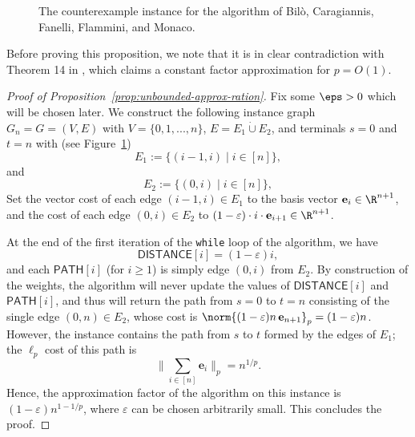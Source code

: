 \documentclass[11pt,a4paper]{article}
\begin{document}
\begin{figure}[H]
    \centering
    
    \caption{The counterexample instance for the algorithm of Bilò, Caragiannis, Fanelli, Flammini, and Monaco.}
    \label{fig:dijkstras-counterexample}
\end{figure}
Before proving this proposition, we note that it is in clear contradiction with Theorem 14 in \cite{bilo2017simple}, which claims a constant factor approximation for $p=O(1)$.
\begin{proof}[Proof of Proposition~\ref{prop:unbounded-approx-ration}]
Fix some \(\eps > 0\) which will be chosen later.
We construct the following instance graph $G_n = G=(V,E)$ with $V=\{0, 1, ... , n \}$, $E = E_1 \dot{\cup} E_2$, and terminals $s = 0$ and $t= n$ with (see Figure~\ref{fig:dijkstras-counterexample})
\[
    E_1 := \{ (i-1,i) \mid i\in [n]\},
\]
and
\[
    E_2:= \{ (0,i) \mid i \in [n]\},
\]
Set the vector cost of each edge $(i-1,i) \in E_1$ to the basis vector $\mathbf{e}_i \in \R^{n+1}$, and the cost of each edge $(0,i) \in E_2$ to $(1-\varepsilon)\cdot i\cdot \mathbf{e}_{i+1}\in \R^{n+1}$. %


At the end of the first iteration of the \texttt{while} loop of the algorithm, we have
\[
   \mathsf{DISTANCE}[i] = (1-\varepsilon) i,
\]
and each $\mathsf{PATH}[i]$ (for $i\geq 1$) is simply edge $(0, i)$ from $E_2$. By construction of the weights, the algorithm will never update the values of $\mathsf{DISTANCE}[i]$ and $\mathsf{PATH}[i]$, and thus will return the path from $s=0$ to $t=n$ consisting of the single edge $(0,n)\in E_2$, whose cost is $\norm{(1-\varepsilon) n\, \mathbf{e}_{n+1}}_p = (1-\varepsilon) n$. However, the instance contains the path from $s$ to $t$ formed by the edges of $E_1$; the $\ell_p$ cost of this path is
\[
    \bigg\|\sum_{i\in [n]} \mathbf{e}_i\bigg\|_p  = n^{1/p}.
\]
Hence, the approximation factor of the algorithm on this instance is $(1-\varepsilon)n^{1-1/p}$, where $\varepsilon$ can be chosen arbitrarily small. This concludes the proof.
\end{proof}
\end{document}
